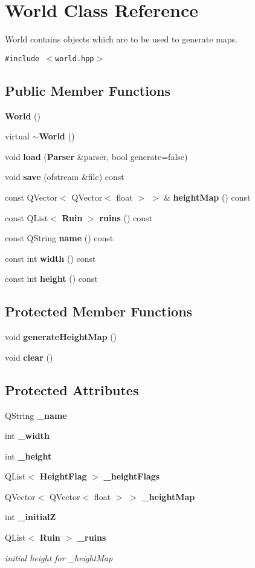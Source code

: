 \section{World Class Reference}
\label{classWorld}
World contains objects which are to be used to generate maps.  


{\tt \#include $<$world.hpp$>$}

\subsection*{Public Member Functions}
\begin{CompactItemize}
\item 
{\bf World} ()
\item 
virtual {\bf $\sim$World} ()
\item 
void {\bf load} ({\bf Parser} \&parser, bool generate=false)
\item 
void {\bf save} (ofstream \&file) const 
\item 
const QVector$<$ QVector$<$ float $>$ $>$ \& {\bf height\-Map} () const 
\item 
const QList$<$ {\bf Ruin} $>$ {\bf ruins} () const 
\item 
const QString {\bf name} () const 
\item 
const int {\bf width} () const 
\item 
const int {\bf height} () const 
\end{CompactItemize}
\subsection*{Protected Member Functions}
\begin{CompactItemize}
\item 
void {\bf generate\-Height\-Map} ()
\item 
void {\bf clear} ()
\end{CompactItemize}
\subsection*{Protected Attributes}
\begin{CompactItemize}
\item 
QString {\bf \_\-name}
\item 
int {\bf \_\-width}
\item 
int {\bf \_\-height}
\item 
QList$<$ {\bf Height\-Flag} $>$ {\bf \_\-height\-Flags}
\item 
QVector$<$ QVector$<$ float $>$ $>$ {\bf \_\-height\-Map}
\item 
int {\bf \_\-initial\-Z}
\item 
QList$<$ {\bf Ruin} $>$ {\bf \_\-ruins}
\begin{CompactList}\small\item\em initial height for \_\-height\-Map \item\end{CompactList}\end{CompactItemize}


